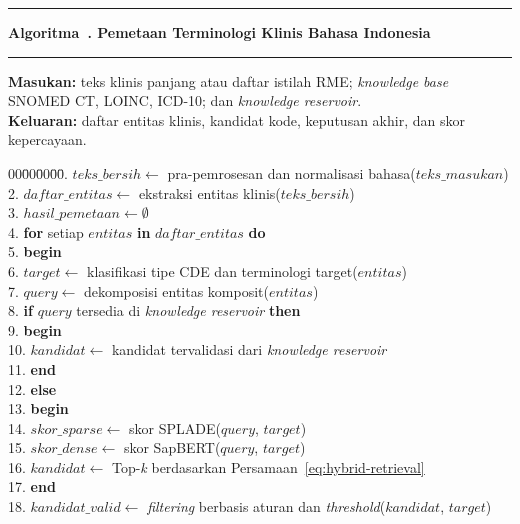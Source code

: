 \begin{center}
\begin{minipage}{0.96\textwidth}
\scriptsize
{}
\label{alg:pemetaan-terminologi}
\hrule
\vspace{0.3em}
\textbf{Algoritma~\thealgoritma. Pemetaan Terminologi Klinis Bahasa Indonesia}
\vspace{0.3em}
\hrule
\vspace{0.5em}
\noindent\textbf{Masukan:} teks klinis panjang atau daftar istilah RME; \textit{knowledge base} SNOMED CT, LOINC, ICD-10; dan \textit{knowledge reservoir}.\\
\textbf{Keluaran:} daftar entitas klinis, kandidat kode, keputusan akhir, dan skor kepercayaan.
\vspace{0.3em}
\begin{tabbing}
00\=00\=00\=00\=. \> $teks\_bersih \leftarrow$ pra-pemrosesan dan normalisasi bahasa($teks\_masukan$)\\
2. \> $daftar\_entitas \leftarrow$ ekstraksi entitas klinis($teks\_bersih$)\\
3. \> $hasil\_pemetaan \leftarrow \emptyset$\\
4. \> \textbf{for} setiap $entitas$ \textbf{in} $daftar\_entitas$ \textbf{do}\\
5. \> \textbf{begin}\\
6. \>\> $target \leftarrow$ klasifikasi tipe CDE dan terminologi target($entitas$)\\
7. \>\> $query \leftarrow$ dekomposisi entitas komposit($entitas$)\\
8. \>\> \textbf{if} $query$ tersedia di \textit{knowledge reservoir} \textbf{then}\\
9. \>\> \textbf{begin}\\
10. \>\>\> $kandidat \leftarrow$ kandidat tervalidasi dari \textit{knowledge reservoir}\\
11. \>\> \textbf{end}\\
12. \>\> \textbf{else}\\
13. \>\> \textbf{begin}\\
14. \>\>\> $skor\_sparse \leftarrow$ skor SPLADE($query$, $target$)\\
15. \>\>\> $skor\_dense \leftarrow$ skor SapBERT($query$, $target$)\\
16. \>\>\> $kandidat \leftarrow$ Top-\textit{k} berdasarkan Persamaan~\ref{eq:hybrid-retrieval}\\
17. \>\> \textbf{end}\\
18. \>\> $kandidat\_valid \leftarrow$ \textit{filtering} berbasis aturan dan \textit{threshold}($kandidat$, $target$)\\

\end{tabbing}
\end{minipage}
\end{center}
